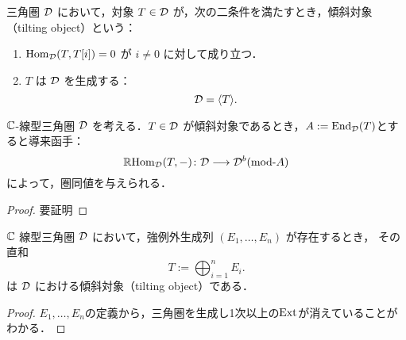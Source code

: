 \begin{defn}[傾斜対象]\cite{BK89}
\label{defn:tilting object}
三角圏 \({\mathcal D}\) において，対象 \(T \in {\mathcal D}\) が，次の二条件を満たすとき，傾斜対象（tilting object）という：
\begin{enumerate}
  \item \(\operatorname{\mathrm{Hom}}_{{\mathcal D}}(T, T[i]) = 0\) が \(i \ne 0\) に対して成り立つ．
  \item \(T\) は \({\mathcal D}\) を生成する：
  \[
  {\mathcal D} = \langle T \rangle.
  \]
\end{enumerate}

\end{defn}

\begin{thm}\cite{BK89}
\label{thm:derived_equivalence_tilting}
\({\mathbb C}\)-線型三角圏 \({\mathcal D}\) を考える．\(T \in {\mathcal D}\) が傾斜対象であるとき，\(A := \operatorname{\mathrm{End}}_{{\mathcal D}}(T)\)とすると導来函手：
\[
\RHom_{\D}(T, -) \colon \D \longrightarrow \D^b(\mod A)
\]
によって，圏同値を与えられる．
\end{thm}

\begin{proof}
{\color{red}要証明}
\end{proof}

\begin{thm}\cite{BK89}
\label{thm:tilting_from_exceptional}
\({\mathbb C}\) 線型三角圏 \({\mathcal D}\) において，強例外生成列 \((E_1, \dots, E_n)\) が存在するとき，
その直和
\[
T := \bigoplus_{i=1}^n E_i.
\]
は \({\mathcal D}\) における傾斜対象（tilting object）である．
\end{thm}
\begin{proof}
	$E_1,\ldots,E_n$の定義から，三角圏を生成し1次以上の$\operatorname{\mathrm{Ext}}$が消えていることがわかる．
\end{proof}
